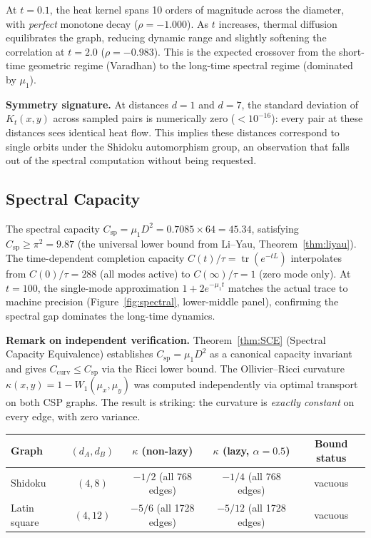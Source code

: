 \documentclass[11pt]{article}
\theoremstyle{definition}
\theoremstyle{remark}
\newcommand{\Csp}{C_{\mathrm{sp}}}
\begin{document}
At $t = 0.1$, the heat kernel spans 10 orders of magnitude across the diameter, with \emph{perfect} monotone decay ($\rho = -1.000$). As $t$ increases, thermal diffusion equilibrates the graph, reducing dynamic range and slightly softening the correlation at $t = 2.0$ ($\rho = -0.983$). This is the expected crossover from the short-time geometric regime (Varadhan) to the long-time spectral regime (dominated by $\mu_1$).

\textbf{Symmetry signature.} At distances $d = 1$ and $d = 7$, the standard deviation of $K_t(x,y)$ across sampled pairs is numerically zero ($< 10^{-16}$): every pair at these distances sees identical heat flow. This implies these distances correspond to single orbits under the Shidoku automorphism group, an observation that falls out of the spectral computation without being requested.


\subsection{Spectral Capacity}

The spectral capacity $\Csp = \mu_1 D^2 = 0.7085 \times 64 = 45.34$, satisfying $\Csp \ge \pi^2 = 9.87$ (the universal lower bound from Li--Yau, Theorem~\ref{thm:liyau}). The time-dependent completion capacity $C(t)/\tau = \operatorname{tr}(e^{-tL})$ interpolates from $C(0)/\tau = 288$ (all modes active) to $C(\infty)/\tau = 1$ (zero mode only). At $t = 100$, the single-mode approximation $1 + 2e^{-\mu_1 t}$ matches the actual trace to machine precision (Figure~\ref{fig:spectral}, lower-middle panel), confirming the spectral gap dominates the long-time dynamics.

\textbf{Remark on independent verification.} Theorem~\ref{thm:SCE} (Spectral Capacity Equivalence) establishes $\Csp = \mu_1 D^2$ as a canonical capacity invariant and gives $C_{\mathrm{curv}} \le \Csp$ via the Ricci lower bound. The Ollivier--Ricci curvature $\kappa(x,y) = 1 - W_1(\mu_x, \mu_y)$ was computed independently via optimal transport on both CSP graphs.  The result is striking: the curvature is \emph{exactly constant} on every edge, with zero variance.

\begin{center}
\begin{tabular}{lcccc}
\toprule
Graph & $(d_A, d_B)$ & $\kappa$ (non-lazy) & $\kappa$ (lazy, $\alpha = 0.5$) & Bound status \\
\midrule
Shidoku & $(4, 8)$ & $-1/2$ (all 768 edges) & $-1/4$ (all 768 edges) & vacuous \\
Latin square & $(4, 12)$ & $-5/6$ (all 1728 edges) & $-5/12$ (all 1728 edges) & vacuous \\
\bottomrule
\end{tabular}
\end{center}
\end{document}
